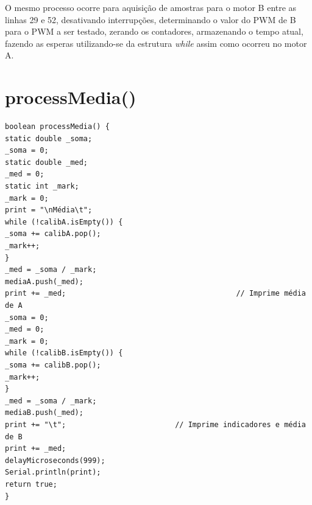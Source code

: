 \documentclass[a4paper,12pt,portuguese]{ufms-cpcx}
\begin{document}
O mesmo processo ocorre para aquisição de amostras para o motor B entre as linhas 29 e 52, desativando interrupções, determinando o valor do PWM de B para o PWM a ser testado, zerando os contadores, armazenando o tempo atual, fazendo as esperas utilizando-se da estrutura \textit{while} assim como ocorreu no motor A.

\chapter{processMedia()} \label{anexo:processmedia}

\begin{lstlisting}
boolean processMedia() {
static double _soma;
_soma = 0;
static double _med;
_med = 0;
static int _mark;
_mark = 0;
print = "\nMédia\t";
while (!calibA.isEmpty()) {
_soma += calibA.pop();
_mark++;
}
_med = _soma / _mark;
mediaA.push(_med);
print += _med;                   			         // Imprime média de A
_soma = 0;
_med = 0;
_mark = 0;
while (!calibB.isEmpty()) {
_soma += calibB.pop();
_mark++;
}
_med = _soma / _mark;
mediaB.push(_med);
print += "\t";         			       // Imprime indicadores e média de B
print += _med;
delayMicroseconds(999);
Serial.println(print);	
return true;
}	
\end{lstlisting}
\end{document}
